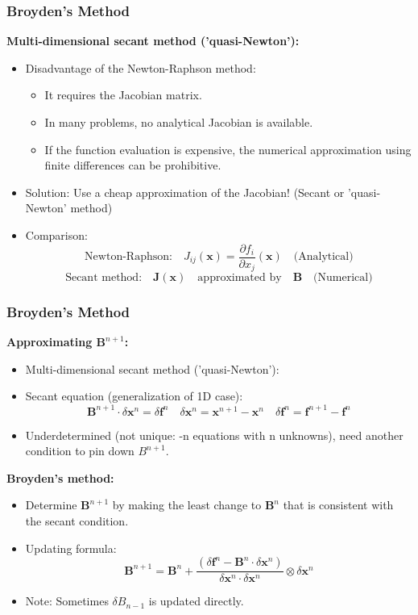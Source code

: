   \begin{frame}[fragile]
    \frametitle{Broyden's Method}
    
    \textbf{Multi-dimensional secant method ('quasi-Newton'):}
    \begin{itemize}
      \item Disadvantage of the Newton-Raphson method:
        \begin{itemize}
          \item It requires the Jacobian matrix.
          \item In many problems, no analytical Jacobian is available.
          \item If the function evaluation is expensive, the numerical approximation using finite differences can be prohibitive.
        \end{itemize}
      \item Solution: Use a cheap approximation of the Jacobian! (Secant or 'quasi-Newton' method)
      \item Comparison:
        \[
        \text{Newton-Raphson:} \quad J_{ij}(\mathbf{x}) = \frac{\partial f_i}{\partial x_j}(\mathbf{x}) \quad \text{(Analytical)}
        \]
        \[
        \text{Secant method:} \quad \mathbf{J}(\mathbf{x}) \quad \text{approximated by}\quad \mathbf{B} \quad \text{(Numerical)}
        \]
    \end{itemize}
  \end{frame}

  \begin{frame}[fragile]
    \frametitle{Broyden's Method}
  
    \textbf{Approximating $\mathbf{B}^{n+1}$:}
    \begin{itemize}
      \item Multi-dimensional secant method ('quasi-Newton'):
      \item Secant equation (generalization of 1D case):
      \[
        \mathbf{B}^{n+1} \cdot \delta \mathbf{x}^n=\delta \mathbf{f}^n \quad \delta \mathbf{x}^n=\mathbf{x}^{n+1}-\mathbf{x}^n \quad \delta \mathbf{f}^n=\mathbf{f}^{n+1}-\mathbf{f}^n
      \]
      \item Underdetermined (not unique: -n equations with n unknowns), need another condition to pin down \(B^{n+1}\).
    \end{itemize}
    \textbf{Broyden's method:}
    \begin{itemize}
      \item  Determine \(\mathbf{B}^{n+1}\) by making the least change to \(\mathbf{B}^{n}\) that is consistent with the secant condition.
      \item Updating formula:
      \[
        \mathbf{B}^{n+1}=\mathbf{B}^n+\frac{\left(\delta \mathbf{f}^n-\mathbf{B}^n \cdot \delta \mathbf{x}^n\right)}{\delta \mathbf{x}^n \cdot \delta \mathbf{x}^n} \otimes \delta \mathbf{x}^n
      \]
      \item Note: Sometimes \(\delta B_{n-1}\) is updated directly.
    \end{itemize}
  \end{frame}
  
